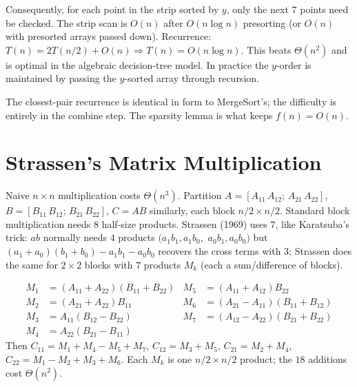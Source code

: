 Consequently, for each point in the strip sorted by $y$, only the next $7$ points need be checked. The strip scan is $O(n)$ after $O(n\log n)$ presorting (or $O(n)$ with presorted arrays passed down). Recurrence: $T(n)=2T(n/2)+O(n)\Rightarrow T(n)=O(n\log n)$. This beats $\Theta(n^2)$ and is optimal in the algebraic decision-tree model. In practice the $y$-order is maintained by passing the $y$-sorted array through recursion.

\begin{remark}
The closest-pair recurrence is identical in form to MergeSort's; the difficulty is entirely in the combine step. The sparsity lemma is what keeps $f(n)=O(n)$.
\end{remark}

\section{Strassen's Matrix Multiplication}
\label{sec:strassen}

Naive $n\times n$ multiplication costs $\Theta(n^3)$.
Partition $A=[A_{11}\,A_{12};\,A_{21}\,A_{22}]$,
$B=[B_{11}\,B_{12};\,B_{21}\,B_{22}]$,
$C=AB$ similarly, each block $n/2\times n/2$.
Standard block multiplication needs $8$ half-size products.
Strassen (1969) uses $7$, like Karatsuba's trick:
$ab$ normally needs $4$ products
$(a_1b_1,a_1b_0,$ $a_0b_1,a_0b_0)$ but
$(a_1+a_0)(b_1+b_0)-a_1b_1-a_0b_0$ recovers the cross terms with $3$;
Strassen does the same for $2\times2$ blocks with $7$ products
$M_k$ (each a sum/difference of blocks).

\begin{align*}
M_1&=(A_{11}+A_{22})(B_{11}+B_{22}) & M_5&=(A_{11}+A_{12})B_{22}\\
M_2&=(A_{21}+A_{22})B_{11}           & M_6&=(A_{21}-A_{11})(B_{11}+B_{12})\\
M_3&=A_{11}(B_{12}-B_{22})           & M_7&=(A_{12}-A_{22})(B_{21}+B_{22})\\
M_4&=A_{22}(B_{21}-B_{11}) &&
\end{align*}
Then $C_{11}=M_1+M_4-M_5+M_7$, $C_{12}=M_3+M_5$, $C_{21}=M_2+M_4$, $C_{22}=M_1-M_2+M_3+M_6$. Each $M_k$ is one $n/2\times n/2$ product; the $18$ additions cost $\Theta(n^2)$.

